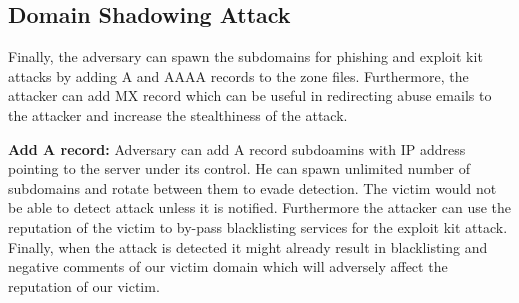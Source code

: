 





\subsection{Domain Shadowing Attack}

Finally, the adversary can spawn the subdomains for phishing and exploit kit attacks by adding A and AAAA records to the zone files. Furthermore, the attacker can add MX record which can be useful in redirecting abuse emails to the attacker and increase the stealthiness of the attack. 

\textbf{Add A record:} 
Adversary can add  A record subdoamins with IP address pointing to the server under its control. He can spawn unlimited number of subdomains and rotate between them to evade detection. %
The victim would not be able to detect attack unless it is notified. Furthermore the attacker can use the reputation of the victim to by-pass blacklisting services for the exploit kit attack. Finally, when the attack is detected it might already result in blacklisting and negative comments of our victim domain which will adversely affect the reputation of our victim. 

